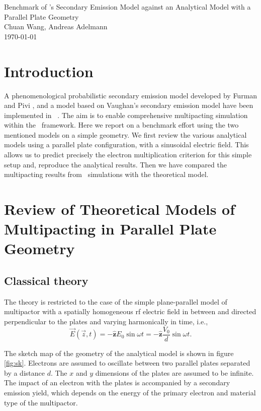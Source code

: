 \documentclass[a4paper,11pt]{article}
\begin{document}
\begin{center}
{\large Benchmark of \opal's Secondary Emission Model against  an Analytical Model with a Parallel Plate Geometry} \\
Chuan Wang, Andreas Adelmann \\
\today\\
\end{center}
\section{Introduction}
A phenomenological probabilistic secondary emission model developed by Furman and Pivi \cite{SE}, and a model based on Vaughan's secondary emission model \cite{VH, FE} have been implemented in \opal\ \cite{OP}. 
The  aim is to enable comprehensive  multipacting simulation within the \opal\ framework. Here we report on a benchmark effort using the two mentioned models on a simple geometry. 
We first review the various analytical models using a parallel plate configuration, with a sinusoidal electric field. This allows us to predict precisely the electron multiplication criterion for this simple setup and, reproduce the analytical results. Then we have compared the multipacting results from \opal\ simulations with the theoretical model.

\section{Review of Theoretical Models of Multipacting in Parallel Plate Geometry} 
\subsection{Classical theory}
The theory is restricted to the case of the simple plane-parallel model of multipactor with a spatially homogeneous rf electric field in between and directed perpendicular to the plates and varying harmonically in time, i.e., 
\begin{equation}
\vec{E}(\vec{z},t) = -\mathbf{\hat{z}}E_0\sin \omega t=-\mathbf{\hat{z}}\frac{V_0}{d}\sin \omega t.
\end{equation} 

The sketch map of the geometry of the analytical model is shown in figure \ref{fig:sk}. Electrons are assumed to oscillate between two parallel plates separated by a distance $d$. The $x$ and $y$ dimensions of the plates are assumed to be infinite. The impact of an electron with the plates is accompanied by a secondary emission yield, which depends on the energy of the primary electron and material type of the multipactor. 
 
\end{document}
